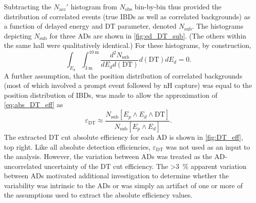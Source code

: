 Subtracting the $N_\text{acc}'$ histogram from $N_\text{obs}$ bin-by-bin
thus provided the distribution of correlated events
(true IBDs as well as correlated backgrounds)
as a function of delayed energy and DT parameter,
denoted $N_\text{sub}$.
The histograms depicting $N_\text{sub}$ for three ADs
are shown in \cref{fig:ed_DT_sub}.
(The others within the same hall were qualitatively identical.)
For these histograms, by construction,
\begin{equation}\label{eq:acc_sub_normalized_zero}
    \int_{E_d}\int_{\SI{3}{\m}}^{\SI{10}{\m}}
    \frac{d^2N_\text{sub}}{dE_d d(\text{DT})}
    d(\text{DT}) dE_d
    = 0.
\end{equation}
A further assumption, that the position distribution of correlated backgrounds
(most of which involved a prompt event followed by nH capture)
was equal to the position distribution of IBDs,
was made to allow the approximation of \cref{eq:abs_DT_eff} as
\begin{equation}\label{eq:abs_DT_eff_approx}
    \varepsilon_{\text{DT}} \approx \frac{
        N_\text{sub}[E_p \wedge E_d \wedge \text{DT}]
    }%
    {
        N_\text{sub}[E_p \wedge E_d]
    }.
\end{equation}
The extracted DT cut absolute efficiency for each AD is shown in
\cref{fig:DT_eff}, top right.
Like all absolute detection efficiencies,
$\varepsilon_{\text{DT}}$ was not used as an input to the \thetaot{} analysis.
However, the variation between ADs was treated as the AD-uncorrelated uncertainty
of the DT cut efficiency.
The \SI{>3}{\percent} apparent variation between ADs
motivated additional investigation
to determine whether the variability was intrinsic to the ADs
or was simply an artifact of one or more of the assumptions
used to extract the absolute efficiency values.

